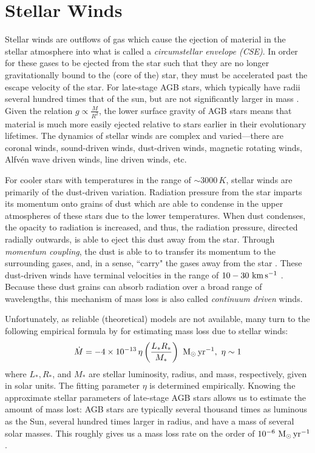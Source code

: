 \documentclass[twocolumn]{aastex63}
\begin{document}
\section{Stellar Winds} \label{sec:winds}

Stellar winds are outflows of gas which cause the ejection of material in the stellar atmosphere into what is called a \textit{circumstellar envelope (CSE)}. In order for these gases to be ejected from the star such that they are no longer gravitationally bound to the (core of the) star, they must be accelerated past the escape velocity of the star. For late-stage AGB stars, which typically have radii several hundred times that of the sun, but are not significantly larger in mass \citep{hofner}. Given the relation $g \propto \frac{M}{R^2}$, the lower surface gravity of AGB stars means that material is much more easily ejected relative to stars earlier in their evolutionary lifetimes. The dynamics of stellar winds are complex and varied—there are coronal winds, sound-driven winds, dust-driven winds, magnetic rotating winds, Alfv\'en wave driven winds, line driven winds, etc. \citep{lamers}

For cooler stars with temperatures in the range of $\sim 3000\,K$, stellar winds are primarily of the dust-driven variation. Radiation pressure from the star imparts its momentum onto grains of dust which are able to condense in the upper atmospheres of these stars due to the lower temperatures. When dust condenses, the opacity to radiation is increased, and thus, the radiation pressure, directed radially outwards, is able to eject this dust away from the star. Through \textit{momentum coupling}, the dust is able to to transfer its momentum to the surrounding gases, and, in a sense, ``carry" the gases away from the star \citep{gilman}. These dust-driven winds have terminal velocities in the range of $10-30~{\rm km\,s^{-1}}$ \citep{lamers}. Because these dust grains can absorb radiation over a broad range of wavelengths, this mechanism of mass loss is also called \textit{continuum driven} winds. 


Unfortunately, as reliable (theoretical) models are not available, many turn to the following empirical formula by \cite{reimers} for estimating mass loss due to stellar winds:
\begin{equation*}
    \dot M = -4\times 10^{-13}\,\eta \left(\frac{L_*R_*}{M_*}\right)~{\rm M_\odot\,yr^{-1}},~{\rm \eta \sim 1}
\end{equation*}
where $L_*, R_*$, and $M_*$ are stellar luminosity, radius, and mass, respectively, given in solar units. The fitting parameter $\eta$ is determined empirically. Knowing the approximate stellar parameters of late-stage AGB stars allows us to estimate the amount of mass lost: AGB stars are typically several thousand times as luminous as the Sun, several hundred times larger in radius, and have a mass of several solar masses. This roughly gives us a mass loss rate on the order of $10^{-6}~{\rm M_\odot\,yr^{-1}}$.
\end{document}
